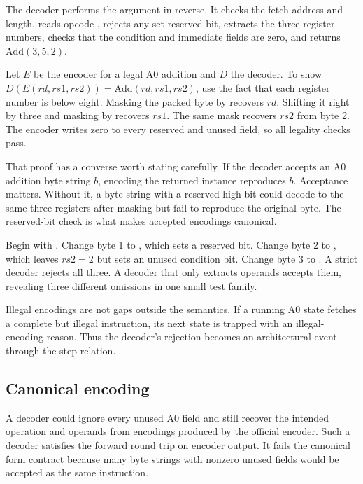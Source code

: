 The decoder performs the argument in reverse. It checks the fetch address and
length, reads opcode , rejects any set reserved bit, extracts the
three register numbers, checks that the condition and immediate fields are
zero, and returns
\(
\mathrm{Add}(3,5,2)
\).

\begin{proofkit}[title={A0 addition round trip}]
Let \(E\) be the encoder for a legal A0 addition and \(D\) the decoder. To
show \(D(E(rd,rs1,rs2))=\mathrm{Add}(rd,rs1,rs2)\), use the fact that
each register number is below eight. Masking the packed byte by 
recovers \(rd\). Shifting it right by three and masking by  recovers
\(rs1\). The same mask recovers \(rs2\) from byte 2. The encoder writes zero
to every reserved and unused field, so all legality checks pass.
\end{proofkit}

That proof has a converse worth stating carefully. If the decoder accepts an
A0 addition byte string \(b\), encoding the returned instance reproduces
\(b\). Acceptance matters. Without it, a byte string with a reserved high bit
could decode to the same three registers after masking but fail to reproduce
the original byte. The reserved-bit check is what makes accepted encodings
canonical.

\begin{tryit}[title={Break the A0 encoding one field at a time}]
Begin with . Change byte 1 to , which sets a
reserved bit. Change byte 2 to , which leaves \(rs2=2\) but sets an
unused condition bit. Change byte 3 to . A strict decoder rejects all
three. A decoder that only extracts operands accepts them, revealing three
different omissions in one small test family.
\end{tryit}

Illegal encodings are not gaps outside the semantics. If a running A0 state
fetches a complete but illegal instruction, its next state is trapped with an
illegal-encoding reason. Thus the decoder's rejection becomes an architectural
event through the step relation.

\subsection{Canonical encoding}

A decoder could ignore every unused A0 field and still recover the intended
operation and operands from encodings produced by the official encoder. Such a
decoder satisfies the forward round trip on encoder output. It fails the
canonical form contract because many byte strings with nonzero unused fields
would be accepted as the same instruction.

